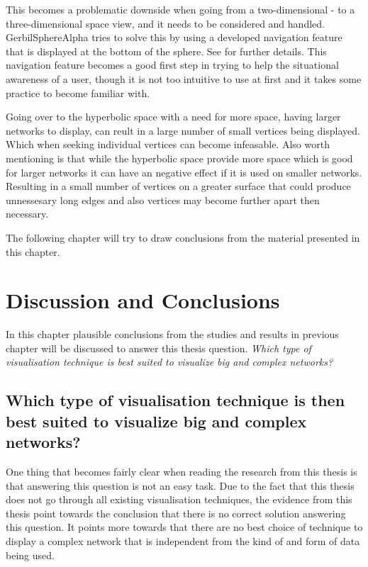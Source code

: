 \documentclass[a4paper,11pt]{kth-mag}
\begin{document}
This becomes a problematic downside when going from a two-dimensional - to a three-dimensional space view, and it needs to be considered and handled. 
GerbilSphereAlpha tries to solve this by using a developed navigation feature that is displayed at the
bottom of the sphere. See \cite{Shelley20121016} for further details. This navigation feature becomes a good first step in 
trying to help the situational awareness of a user, though it is not too intuitive to use at first and it takes some practice to become familiar with.

Going over to the hyperbolic space with a need for more space, having larger networks to display, can reult in a large number of small vertices being displayed.
Which when seeking individual vertices can become infeasable.
Also worth mentioning is that while the hyperbolic space provide more space which is good for larger networks it can 
have an negative effect if it is used on smaller networks. Resulting in a small number of vertices on a greater surface that could produce unnessesary long edges and also vertices
may become further apart then necessary.

The following chapter will try to draw conclusions from the material presented in this chapter.
\chapter{Discussion and Conclusions}
\label{chapter:five}
In this chapter plausible conclusions from the studies and results in previous chapter will be discussed to answer this thesis question.
\emph{Which type of visualisation technique is best suited to visualize big and complex networks?}\\

\section{Which type of visualisation technique is then best suited to visualize big and complex networks?}
\label{sec:conclution}
One thing that becomes fairly clear when reading the research from this thesis is that answering this question
is not an easy task. Due to the fact that this thesis does not go through all existing visualisation techniques,
the evidence from this thesis point towards the conclusion that there is no correct solution answering this
question. It points more towards that there are no best choice of technique to display a complex network that is
independent from the kind of and form of data being used.
\end{document}
